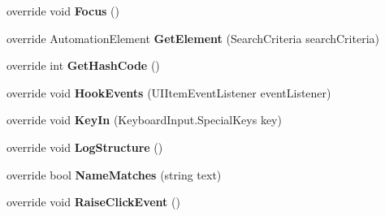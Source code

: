 \begin{DoxyCompactItemize}
\item 
\hypertarget{class_proto_test_1_1_golem_1_1_white_1_1_elements_1_1_white_table_a20a42dcc88788031938fae166462de23}{override void {\bfseries Focus} ()}\label{class_proto_test_1_1_golem_1_1_white_1_1_elements_1_1_white_table_a20a42dcc88788031938fae166462de23}

\item 
\hypertarget{class_proto_test_1_1_golem_1_1_white_1_1_elements_1_1_white_table_a20cb15524aab26a2a0bc09fd209ad79b}{override Automation\-Element {\bfseries Get\-Element} (Search\-Criteria search\-Criteria)}\label{class_proto_test_1_1_golem_1_1_white_1_1_elements_1_1_white_table_a20cb15524aab26a2a0bc09fd209ad79b}

\item 
\hypertarget{class_proto_test_1_1_golem_1_1_white_1_1_elements_1_1_white_table_af78eb03b1667a2a78a0709d235ec0038}{override int {\bfseries Get\-Hash\-Code} ()}\label{class_proto_test_1_1_golem_1_1_white_1_1_elements_1_1_white_table_af78eb03b1667a2a78a0709d235ec0038}

\item 
\hypertarget{class_proto_test_1_1_golem_1_1_white_1_1_elements_1_1_white_table_aea9be1ec09bf99184674ba186aefe047}{override void {\bfseries Hook\-Events} (U\-I\-Item\-Event\-Listener event\-Listener)}\label{class_proto_test_1_1_golem_1_1_white_1_1_elements_1_1_white_table_aea9be1ec09bf99184674ba186aefe047}

\item 
\hypertarget{class_proto_test_1_1_golem_1_1_white_1_1_elements_1_1_white_table_a641a404c7f21c71858d2bfaf6e7d6a15}{override void {\bfseries Key\-In} (Keyboard\-Input.\-Special\-Keys key)}\label{class_proto_test_1_1_golem_1_1_white_1_1_elements_1_1_white_table_a641a404c7f21c71858d2bfaf6e7d6a15}

\item 
\hypertarget{class_proto_test_1_1_golem_1_1_white_1_1_elements_1_1_white_table_a1e715780624271739ea2eb3bf7c748c7}{override void {\bfseries Log\-Structure} ()}\label{class_proto_test_1_1_golem_1_1_white_1_1_elements_1_1_white_table_a1e715780624271739ea2eb3bf7c748c7}

\item 
\hypertarget{class_proto_test_1_1_golem_1_1_white_1_1_elements_1_1_white_table_a67f63c1d1564a39cc19ea6350a95abb4}{override bool {\bfseries Name\-Matches} (string text)}\label{class_proto_test_1_1_golem_1_1_white_1_1_elements_1_1_white_table_a67f63c1d1564a39cc19ea6350a95abb4}

\item 
\hypertarget{class_proto_test_1_1_golem_1_1_white_1_1_elements_1_1_white_table_a9a1d926607d59b7facdb2b117a6f60a6}{override void {\bfseries Raise\-Click\-Event} ()}\label{class_proto_test_1_1_golem_1_1_white_1_1_elements_1_1_white_table_a9a1d926607d59b7facdb2b117a6f60a6}


\end{DoxyCompactItemize}
